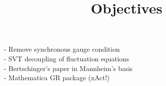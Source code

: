 \documentclass[10pt,letterpaper]{article}
\title{Objectives}
\author{}
\date{}
\begin{document}
\maketitle
\noindent 
- Remove synchronous gauge condition\\
- SVT decoupling of fluctuation equations\\
- Bertschinger's paper in Mannheim's basis\\
- Mathematica GR package (xAct!)\\
\end{document}
